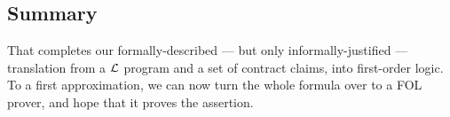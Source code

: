 \subsection{Summary}

That completes our formally-described --- but only informally-justified --- translation
from a $\cal L$ program and a set of contract claims, into first-order logic.
To a first approximation, we can now turn the whole formula over to a FOL prover,
and hope that it proves the assertion.


